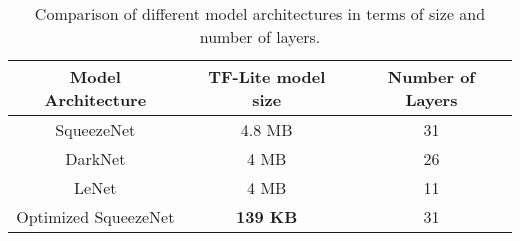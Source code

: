 \begin{table}[]
    \centering
    \begin{tabular}{|c|c|c|}
        \hline Model Architecture & TF-Lite model size & Number of Layers  \\\hline
        \hline SqueezeNet & 4.8 MB & 31 \\\hline
        DarkNet &  4 MB & 26 \\\hline
        LeNet & 4 MB & 11 \\\hline
        Optimized SqueezeNet & \textbf{139 KB} & 31 \\\hline
    \end{tabular}
    \caption{Comparison of different model architectures in terms of size and number of layers.}
    \label{tab:model_archs}
\end{table}